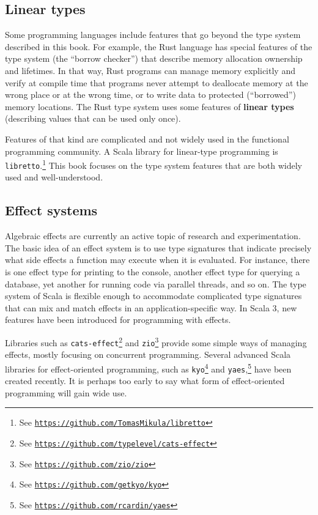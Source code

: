 \subsection{Linear types}

Some programming languages include features that go beyond the type
system described in this book. For example, the Rust language has
special features of the type system (the \textsf{``}borrow checker\textsf{''}) that
describe memory allocation ownership and lifetimes. In that way, Rust
programs can manage memory explicitly and verify at compile time that
programs never attempt to deallocate memory at the wrong place or
at the wrong time, or to write data to protected (\textsf{``}borrowed\textsf{''})
memory locations. The Rust type system uses some features of \textbf{linear
types} (describing values
that can be used only once).

Features of that kind are complicated and not widely used in the functional
programming community. A Scala library for linear-type programming
is \lstinline!libretto!.\footnote{See \texttt{\href{https://github.com/TomasMikula/libretto}{https://github.com/TomasMikula/libretto}}}
This book focuses on the type system features that are both widely
used and well-understood.

\subsection{Effect systems}

Algebraic effects are currently an active topic of research and experimentation.
The basic idea of an effect system is to use type signatures that
indicate precisely what side effects a function may execute when it
is evaluated. For instance, there is one effect type for printing
to the console, another effect type for querying a database, yet another
for running code via parallel threads, and so on. The type system
of Scala is flexible enough to accommodate complicated type signatures
that can mix and match effects in an application-specific way. In
Scala 3, new features have been introduced for programming with effects.

Libraries such as \lstinline!cats-effect!\footnote{See \texttt{\href{https://github.com/typelevel/cats-effect}{https://github.com/typelevel/cats-effect}}}
and \lstinline!zio!\footnote{See \texttt{\href{https://github.com/zio/zio}{https://github.com/zio/zio}}}
provide some simple ways of managing effects, mostly focusing on concurrent
programming. Several advanced Scala libraries for effect-oriented
programming, such as \lstinline!kyo!\footnote{See \texttt{\href{https://github.com/getkyo/kyo}{https://github.com/getkyo/kyo}}}
and \lstinline!yaes!,\footnote{See \texttt{\href{https://github.com/rcardin/yaes}{https://github.com/rcardin/yaes}}}
have been created recently. It is perhaps too early to say what form
of effect-oriented programming will gain wide use.

